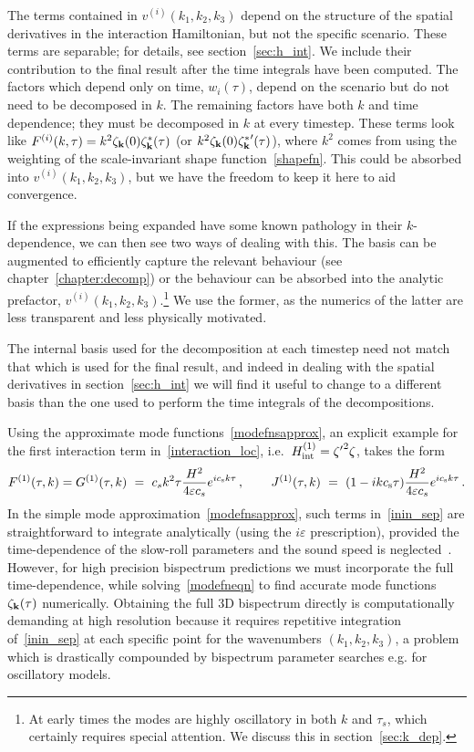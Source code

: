 The terms contained in $v^{(i)}(k_1, k_2,k_3)$ depend on the structure of the spatial derivatives in the interaction Hamiltonian,
but not the specific scenario. These terms are separable; for details, see section~\ref{sec:h_int}.
We include their contribution to the final result after the time integrals have been computed.
The factors which depend only on time, $w_i(\tau)$, depend on the scenario
but do not need to be decomposed in $k$.
The remaining factors have both $k$ and time dependence;
they must be decomposed in $k$ at every timestep.
These terms look like $F^{(i)}(k, \tau) = k^{2} \zeta_{\bf k}(0)\zeta_{\bf k}^*(\tau)$
(or $k ^{2} \zeta_{\bf k}(0){\zeta_{\bf k}^*}'(\tau)$),
where $k^2$ comes from using the weighting of the scale-invariant shape function~\eqref{shapefn}.
This could be absorbed into $v^{(i)}(k_1, k_2,k_3)$, but we have the freedom to keep it here to aid convergence.

If the expressions being expanded have some known pathology in their $k$-dependence,
we can then see two ways of dealing with this.
The basis can be augmented to efficiently capture the relevant behaviour
(see chapter~\ref{chapter:decomp})
or the behaviour can be absorbed into the analytic prefactor, $v^{(i)}(k_1, k_2,k_3)$.\footnote{At early times the modes are highly oscillatory in both $k$ and $\tau_s$, which certainly requires special attention.
We discuss this in section~\ref{sec:k_dep}.}
We use the former, as the numerics of the latter are less transparent
and less physically motivated.

The internal basis used for the decomposition at each timestep need not match that
which is used for the final result,
and indeed in dealing with the spatial derivatives in section~\ref{sec:h_int}
we will find it useful to change to a different basis than the one used to perform the
time integrals of the decompositions.

Using the approximate mode functions~\eqref{modefnsapprox}, an explicit example for the first interaction term in~\eqref{interaction_loc}, i.e.\ $H_{\rm int}^{(1)} = {\zeta'}^2\zeta$, takes the form
\begin{align}\label{inin_example}
    F^{(1)}(\tau,k) = G^{(1)}(\tau,k)  ~=~  c_s k^2 \tau\frac{H^2}{4\varepsilon c_s} e^{ic_{\rm s} k\tau} \, , \qquad\,
    J^{(1)}(\tau,k) ~=~ (1-ik c_{\rm s}\tau)\frac{H^2}{4\varepsilon c_s}e^{ic_{\rm s} k\tau} \,.
\end{align}
In the simple mode approximation~\eqref{modefnsapprox}, such terms in~\eqref{inin_sep} are straightforward to integrate analytically (using the $i\varepsilon$ prescription), provided the time-dependence of the slow-roll parameters and the sound speed is neglected~\cite{Maldacena}.   However, for high precision bispectrum predictions we must incorporate the full time-dependence, while solving~\eqref{modefneqn} to find accurate mode functions $\zeta_{\bf k}(\tau)$ numerically.  Obtaining the full 3D bispectrum directly is computationally demanding at high resolution because it requires repetitive integration of~\eqref{inin_sep} at each specific point for the wavenumbers $(k_1, k_2, k_3)$, a problem which is drastically compounded by bispectrum parameter searches e.g. for oscillatory models. 

